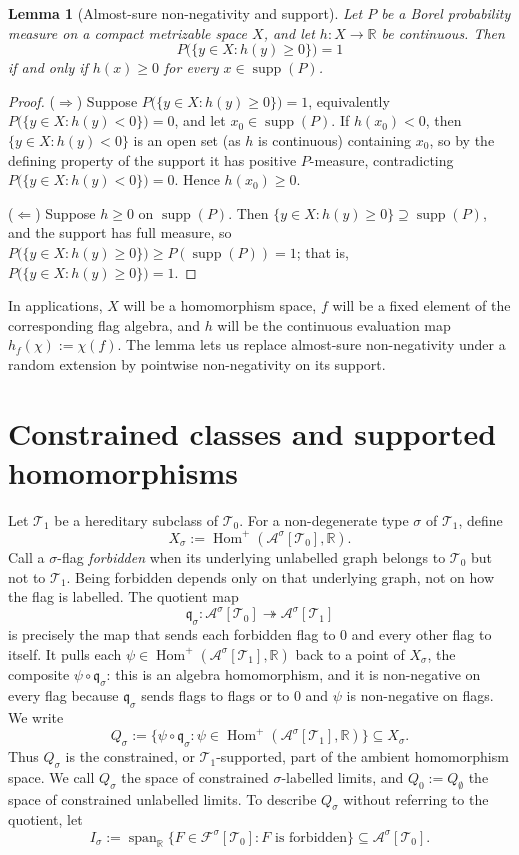 \documentclass[11pt]{article}
\newtheorem{lemma}[lemma]{Lemma}
\theoremstyle{definition}
\newcommand{\R}{\mathbb{R}}
\newcommand{\A}{\mathcal{A}}
\newcommand{\F}{\mathcal{F}}
\newcommand{\T}{\mathcal{T}}
\newcommand{\Homp}{\operatorname{Hom}^{+}}
\newcommand{\supp}{\operatorname{supp}}
\newcommand{\qmap}{\mathfrak q}
\begin{document}
\begin{lemma}[Almost-sure non-negativity and support]\label{lem:support-as}
Let $P$ be a Borel probability measure on a compact metrizable space $X$, and let
$h:X\to\R$ be continuous.  Then
\[
  P\bigl(\{y\in X:h(y)\ge0\}\bigr)=1
\]
if and only if $h(x)\ge0$ for every $x\in\supp(P)$.
\end{lemma}

\begin{proof}
($\Rightarrow$) Suppose $P\bigl(\{y\in X:h(y)\ge0\}\bigr)=1$, equivalently
$P\bigl(\{y\in X:h(y)<0\}\bigr)=0$, and let $x_0\in\supp(P)$.  If $h(x_0)<0$,
then $\{y\in X:h(y)<0\}$ is an open set (as $h$ is continuous) containing $x_0$, so
by the defining property of the support it has positive $P$-measure, contradicting
$P\bigl(\{y\in X:h(y)<0\}\bigr)=0$.  Hence $h(x_0)\ge0$.

($\Leftarrow$) Suppose $h\ge0$ on $\supp(P)$.  Then
$\{y\in X:h(y)\ge0\}\supseteq\supp(P)$, and the support has full measure, so
$P\bigl(\{y\in X:h(y)\ge0\}\bigr)\ge P(\supp(P))=1$; that is,
$P\bigl(\{y\in X:h(y)\ge0\}\bigr)=1$.
\end{proof}

In applications, $X$ will be a homomorphism space, $f$ will be a fixed element of the
corresponding flag algebra, and $h$ will be the continuous evaluation map
$h_f(\chi):=\chi(f)$.  The lemma lets us replace almost-sure non-negativity under a random
extension by pointwise non-negativity on its support.

\section{Constrained classes and supported homomorphisms}

Let $\T_1$ be a hereditary subclass of $\T_0$.  For a non-degenerate type $\sigma$ of
$\T_1$, define
\[
  X_\sigma:=\Homp(\A^\sigma[\T_0],\R).
\]
Call a $\sigma$-flag \emph{forbidden} when its underlying unlabelled graph belongs to
$\T_0$ but not to $\T_1$.  Being forbidden depends only on
that underlying graph, not on how the flag is labelled.  The quotient map
\[
  \qmap_\sigma:\A^\sigma[\T_0]\twoheadrightarrow\A^\sigma[\T_1]
\]
is precisely the map that sends each forbidden flag to $0$ and every other flag to itself.
It pulls each $\psi\in\Homp(\A^\sigma[\T_1],\R)$ back to a point of $X_\sigma$, the composite
${\psi} \circ {\qmap_\sigma}$: this is an algebra homomorphism, and it is non-negative on every
flag because $\qmap_\sigma$ sends flags to flags or to $0$ and $\psi$ is non-negative on
flags.  We write
\[
  Q_\sigma
  :=
  \{\psi\circ\qmap_\sigma:
      \psi\in\Homp(\A^\sigma[\T_1],\R)\}
  \subseteq X_\sigma.
\]
Thus $Q_\sigma$ is the constrained, or $\T_1$-supported, part of the ambient homomorphism
space.  We call $Q_\sigma$ the space of constrained
$\sigma$-labelled limits, and $Q_0:=Q_\emptyset$ the space of constrained unlabelled
limits.  To describe $Q_\sigma$ without referring to the quotient, let
\[
  I_\sigma
  :=
  \operatorname{span}_{\R}
  \{F\in\F^\sigma[\T_0]:F\text{ is forbidden}\}
  \subseteq \A^\sigma[\T_0].
\]
\end{document}

